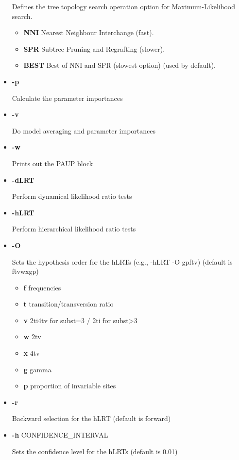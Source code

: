 \documentclass[11pt,twoside,a4paper]{article}
\begin{document}
\begin{itemize}
Defines the tree topology search operation option for Maximum-Likelihood search. 
\begin{itemize}
     \item {\bf NNI} Nearest Neighbour Interchange (fast).
     \item {\bf SPR} Subtree Pruning and Regrafting (slower).
     \item {\bf BEST} Best of NNI and SPR (slowest option) (used by default).
\end{itemize}


\item  {\bf -p}

Calculate the parameter importances

\item  {\bf -v}

Do model averaging and parameter importances

\item  {\bf -w}

Prints out the PAUP block

\item  {\bf -dLRT}

Perform dynamical likelihood ratio tests

\item  {\bf -hLRT}

Perform hierarchical likelihood ratio tests

\item  {\bf -O}

Sets the hypothesis order for the hLRTs (e.g., -hLRT -O gpftv) (default is ftvwxgp)
\begin{itemize}
\item {\bf f} frequencies
\item {\bf t} transition/transversion ratio
\item {\bf v} 2ti4tv for subst=3 / 2ti for subst>3
\item {\bf w} 2tv
\item {\bf x} 4tv
\item {\bf g} gamma
\item {\bf p} proportion of invariable sites
\end{itemize}

\item  {\bf -r}

Backward selection for the hLRT (default is forward)

\item  {\bf -h} CONFIDENCE\_INTERVAL

Sets the confidence level for the hLRTs (default is 0.01)


\end{itemize}
\end{document}
